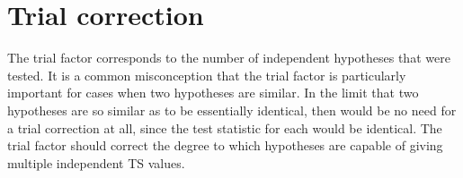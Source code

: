\section{Trial correction}


The trial factor corresponds to the number of independent hypotheses that were tested. It is a common misconception that the trial factor is particularly important for cases when two hypotheses are similar. In the limit that two hypotheses are so similar as to be essentially identical, then would be no need for a trial correction at all, since the test statistic for each would be identical. The trial factor should correct the degree to which hypotheses are capable of giving multiple independent TS values.
